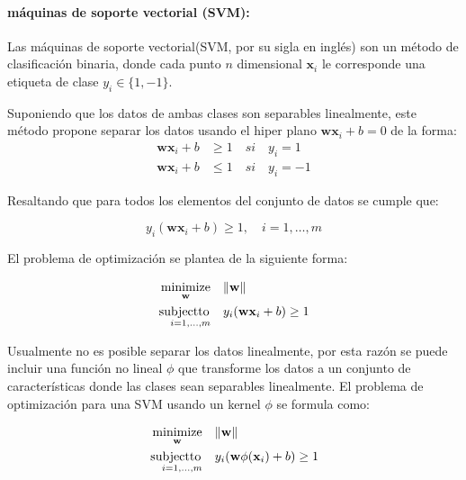 \paragraph{máquinas de soporte vectorial (SVM):}

Las máquinas de soporte vectorial(SVM, por su sigla en inglés) \cite{suthaharan2016support} son un método de clasificación binaria, donde cada punto $n$ dimensional $\mathbf{x}_i$ le corresponde una etiqueta de clase $y_i \in \{1,-1\}$.

Suponiendo que los datos de ambas clases son separables linealmente, este método propone separar los datos usando el hiper plano $\mathbf{w}\mathbf{x}_i + b = 0$ de la forma:
\begin{equation}
    \begin{split}
        \mathbf{w}\mathbf{x}_i + b &\geq 1 \quad si \quad y_i=1 \\
        \mathbf{w}\mathbf{x}_i + b &\leq 1 \quad si \quad y_i=-1
    \end{split}
\end{equation}

Resaltando que para todos los elementos del conjunto de datos se cumple que:

\begin{equation}
    y_i(\mathbf{w}\mathbf{x}_i + b) \geq 1, \quad i=1,\dots, m
\end{equation}

El problema de optimización se plantea de la siguiente forma:

\begin{equation}
    \begin{aligned}
        \operatorname*{minimize}_{\mathbf{w}} & \quad \Vert \mathbf{w} \Vert \\
        \operatorname*{subjectto}_{\quad i=1,\dots, m} & \quad y_i(\mathbf{w}\mathbf{x}_i + b) \geq 1
    \end{aligned}
\end{equation}

Usualmente no es posible separar los datos linealmente, por esta razón se puede incluir una función no lineal $ \phi$ que transforme los datos a un conjunto de características donde las clases sean separables linealmente. El problema de optimización para una SVM usando un kernel $\phi$ se formula como:

\begin{equation}
    \begin{aligned}
        \operatorname*{minimize}_{\mathbf{w}} & \quad \Vert \mathbf{w} \Vert \\
        \operatorname*{subjectto}_{\quad i=1,\dots, m} & \quad y_i(\mathbf{w}\phi(\mathbf{x}_i) + b) \geq 1
    \end{aligned}
\end{equation}



